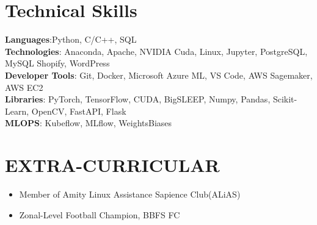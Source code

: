 \documentclass[letterpaper,11pt]{article}
\newcommand{\achievementItem}[1]{
  \item\small{
    {#1 \vspace{-6pt}}
  }
}
\begin{document}
 
\section{Technical Skills}
 \begin{itemize}[leftmargin=0.15in, label={}]
    \small{\item{
     \textbf{Languages}{:Python, C/C++, SQL} \\
     \vspace{1pt}
     \textbf{Technologies}{: Anaconda, Apache, NVIDIA Cuda, Linux, Jupyter, PostgreSQL, MySQL Shopify, WordPress} \\
     \vspace{1pt}
     \textbf{Developer Tools}{: Git, Docker, Microsoft Azure ML, VS Code, AWS Sagemaker, AWS EC2} \\
     \vspace{1pt}
     \textbf{Libraries}{: PyTorch, TensorFlow, CUDA, BigSLEEP, Numpy, Pandas, Scikit-Learn, OpenCV, FastAPI, Flask} \\
     \vspace{1pt}
     \textbf{MLOPS}{: Kubeflow, MLflow, WeightsBiases} \\
    }}
 \end{itemize}



\section{EXTRA-CURRICULAR}

\begin{itemize}[leftmargin=0.2in]

  \achievementItem{Member of Amity Linux Assistance Sapience Club(ALiAS)}
  \achievementItem{Zonal-Level Football Champion, BBFS FC}

\end{itemize}
\end{document}

